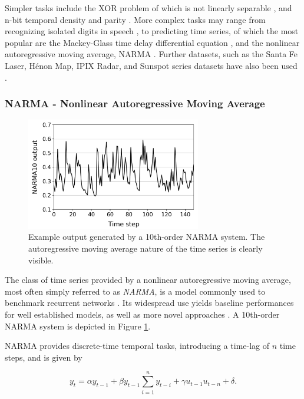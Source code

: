 Simpler tasks include the XOR problem of which is not linearly separable
\cite{goos_pattern_2003}, and n-bit temporal density and parity
\cite{bertschinger_real-time_2004}. More complex tasks may range from
recognizing isolated digits in speech \cite{verstraeten_isolated_2005}, to
predicting time series, of which the most popular are the Mackey-Glass time
delay differential equation \cite{mackey_oscillation_1977}, and the nonlinear
autoregressive moving average, NARMA \cite{atiya_new_2000}. Further datasets,
such as the Santa Fe Laser, Hénon Map, IPIX Radar, and Sunspot series datasets
have also been used \cite{rodan_minimum_2011}.

\subsubsection{NARMA - Nonlinear Autoregressive Moving Average}

\begin{figure}[t!]
  \centering
  \includegraphics[width=3.0in]{figures/NARMA10.png}
  \caption{
    Example output generated by a 10th-order NARMA system. The autoregressive
moving average nature of the time series is clearly visible.
  }
  \label{fig:narma10}
\end{figure}

The class of time series provided by a nonlinear autoregressive moving average,
most often simply referred to as \textit{NARMA}, is a model commonly used to
benchmark recurrent networks \cite{atiya_new_2000}. Its widespread use yields
baseline performances for well established models, as well as more novel
approaches \cite{verstraeten_experimental_2007, appeltant_information_2011}. A
10th-order NARMA system is depicted in Figure \ref{fig:narma10}.

NARMA provides discrete-time temporal tasks, introducing a time-lag of $n$ time
steps, and is given by

\begin{equation}
  y_{t} = \alpha y_{t-1} +
  \beta y_{t-1} \sum_{i=1}^{n}y_{t-i} +
  \gamma u_{t-1}u_{t-n} +
  \delta
  .
  \label{eq:narma}
\end{equation}

